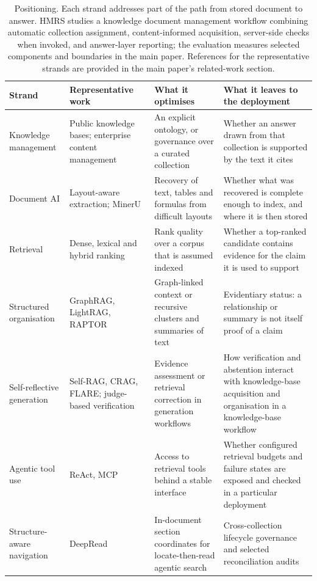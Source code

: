 \documentclass[final,5p,times,twocolumn]{elsarticle}
\begin{document}
\begin{table}[t]
\centering
\small
\setlength{\tabcolsep}{4pt}
\renewcommand{\arraystretch}{1.18}
\caption{Positioning. Each strand addresses part of the path from stored
document to answer. HMRS studies a knowledge document management workflow
combining automatic collection assignment, content-informed acquisition,
server-side checks when invoked, and answer-layer reporting; the evaluation
measures selected components and boundaries in the main paper. References for
the representative strands are provided in the main paper's related-work section.}

\begin{tabular}{@{}>{\raggedright\arraybackslash}p{}>{\raggedright\arraybackslash}p{}>{\raggedright\arraybackslash}p{}>{\raggedright\arraybackslash}p{}@{}}
\toprule
Strand & Representative work & What it optimises & What it leaves to the deployment\\
\midrule
Knowledge management & Public knowledge bases; enterprise content management & An explicit ontology, or governance over a curated collection & Whether an answer drawn from that collection is supported by the text it cites\\
Document AI & Layout-aware extraction; MinerU & Recovery of text, tables and formulas from difficult layouts & Whether what was recovered is complete enough to index, and where it is then stored\\
Retrieval & Dense, lexical and hybrid ranking & Rank quality over a corpus that is assumed indexed & Whether a top-ranked candidate contains evidence for the claim it is used to support\\
Structured organisation & GraphRAG, LightRAG, RAPTOR & Graph-linked context or recursive clusters and summaries of text & Evidentiary status: a relationship or summary is not itself proof of a claim\\
Self-reflective generation & Self-RAG, CRAG, FLARE; judge-based verification & Evidence assessment or retrieval correction in generation workflows & How verification and abstention interact with knowledge-base acquisition and organisation in a knowledge-base workflow\\
Agentic tool use & ReAct, MCP & Access to retrieval tools behind a stable interface & Whether configured retrieval budgets and failure states are exposed and checked in a particular deployment\\
Structure-aware navigation & DeepRead  & In-document section coordinates for locate-then-read agentic search & Cross-collection lifecycle governance and selected reconciliation audits\\

\end{tabular}
\end{table}
\end{document}
